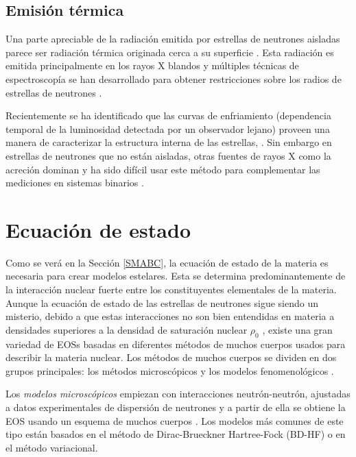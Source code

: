 \subsection{Emisión térmica}

\noindent Una parte apreciable de la radiación emitida por estrellas de neutrones aisladas parece ser radiación térmica originada cerca a su superficie \cite{Potekhin2010}. Esta radiación es emitida principalmente en los rayos X blandos y múltiples técnicas de espectroscopía se han desarrollado para obtener restricciones sobre los radios de estrellas de neutrones \cite{Ozel2016}.


Recientemente se ha identificado que las curvas de enfriamiento (dependencia temporal de la luminosidad detectada por un observador lejano) proveen una manera de caracterizar la estructura interna de las estrellas, \cite{Yakovlev2004}. Sin embargo en estrellas de neutrones que no están aisladas, otras fuentes de rayos X como la acreción dominan y ha sido difícil usar este método para complementar las mediciones en sistemas binarios \cite{Potekhin2010}.


\section{Ecuación de estado}\label{EOS}

\noindent Como se verá en la Sección \ref{SMABC}, la ecuación de estado de la materia es necesaria para crear modelos estelares. Esta se determina predominantemente de la interacción nuclear fuerte entre los constituyentes elementales de la materia. Aunque la ecuación de estado de las estrellas de neutrones sigue siendo un misterio, debido a que estas interacciones no son bien entendidas en materia a densidades superiores a la densidad de saturación nuclear $\rho_0$ \cite{Haensel2007}, existe una gran variedad de EOSs basadas en diferentes métodos de muchos cuerpos usados para describir la materia nuclear. Los métodos de muchos cuerpos se dividen en dos grupos principales: los métodos microscópicos y los modelos fenomenológicos \cite{Rezzolla2018,Giai2010}.

Los \emph{modelos microscópicos} empiezan con interacciones neutrón-neutrón, ajustadas a datos experimentales de dispersión de neutrones y a partir de ella se obtiene la EOS usando un esquema de muchos cuerpos \cite{Ring1980}. Los modelos más comunes de este tipo están basados en el método de Dirac-Brueckner Hartree-Fock (BD-HF) o en el método variacional.

